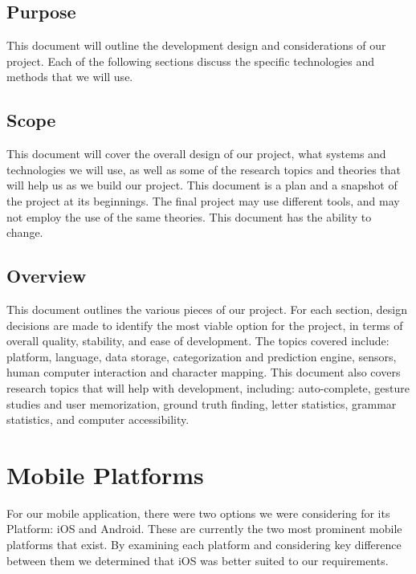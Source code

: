 \documentclass[onecolumn, draftclsnofoot,10pt, journal, letterpaper]{IEEEtran}
\begin{document}
    \subsection{Purpose}
    This document will outline the development design and considerations of our project. Each of the following sections discuss the specific technologies and methods that we will use.
    \subsection{Scope}
    This document will cover the overall design of our project, what systems and technologies we will use, as well as some of the research topics and theories that will help us as we build our project. This document is a plan and a snapshot of the project at its beginnings. The final project may use different tools, and may not employ the use of the same theories. This document has the ability to change.
    \subsection{Overview}
    This document outlines the various pieces of our project. For each section, design decisions are made to identify the most viable option for the project, in terms of overall quality, stability, and ease of development. The topics covered include: platform, language, data storage, categorization and prediction engine, sensors, human computer interaction and character mapping. This document also covers research topics that will help with development, including: auto-complete, gesture studies and user memorization, ground truth finding, letter statistics, grammar statistics, and computer accessibility.

\section{Mobile Platforms}
    For our mobile application, there were two options we were considering for its Platform: iOS and Android. These are currently the two most prominent mobile platforms that exist. By examining each platform and considering key difference between them we determined that iOS was better suited to our requirements.
    
\end{document}
